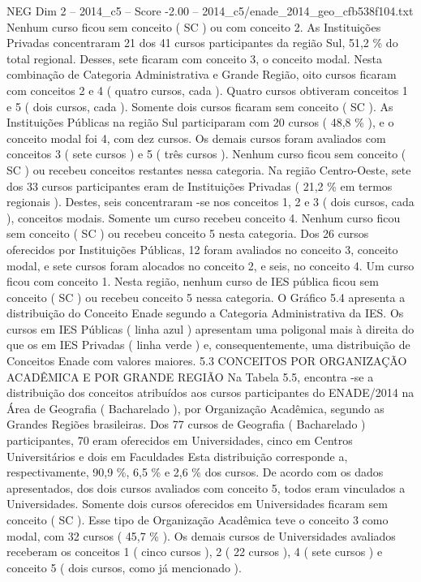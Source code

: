 \begin{textsample}{NEG Dim 2 – 2014\_c5 – Score -2.00 – 2014\_c5/enade\_2014\_geo\_cfb538f104.txt}
Nenhum curso ficou sem conceito ( SC ) ou com conceito 2.
As Instituições Privadas concentraram 21 dos 41 cursos participantes da região Sul, 51,2 \% do total regional.
Desses, sete ficaram com conceito 3, o conceito modal.
Nesta combinação de Categoria Administrativa e Grande Região, oito cursos ficaram com conceitos 2 e 4 ( quatro cursos, cada ).
Quatro cursos obtiveram conceitos 1 e 5 ( dois cursos, cada ).
Somente dois cursos ficaram sem conceito ( SC ).
As Instituições Públicas na região Sul participaram com 20 cursos ( 48,8 \% ), e o conceito modal foi 4, com dez cursos.
Os demais cursos foram avaliados com conceitos 3 ( sete cursos ) e 5 ( três cursos ).
Nenhum curso ficou sem conceito ( SC ) ou recebeu conceitos restantes nessa categoria.
Na região Centro-Oeste, sete dos 33 cursos participantes eram de Instituições Privadas ( 21,2 \% em termos regionais ).
Destes, seis concentraram -se nos conceitos 1, 2 e 3 ( dois cursos, cada ), conceitos modais.
Somente um curso recebeu conceito 4.
Nenhum curso ficou sem conceito ( SC ) ou recebeu conceito 5 nesta categoria.
Dos 26 cursos oferecidos por Instituições Públicas, 12 foram avaliados no conceito 3, conceito modal, e sete cursos foram alocados no conceito 2, e seis, no conceito 4.
Um curso ficou com conceito 1.
Nesta região, nenhum curso de IES pública ficou sem conceito ( SC ) ou recebeu conceito 5 nessa categoria.
O Gráfico 5.4 apresenta a distribuição do Conceito Enade segundo a Categoria Administrativa da IES.
Os cursos em IES Públicas ( linha azul ) apresentam uma poligonal mais à direita do que os em IES Privadas ( linha verde ) e, consequentemente, uma distribuição de Conceitos Enade com valores maiores. 5.3 CONCEITOS POR ORGANIZAÇÃO ACADÊMICA E POR GRANDE REGIÃO Na Tabela 5.5, encontra -se a distribuição dos conceitos atribuídos aos cursos participantes do ENADE/2014 na Área de Geografia ( Bacharelado ), por Organização Acadêmica, segundo as Grandes Regiões brasileiras.
Dos 77 cursos de Geografia ( Bacharelado ) participantes, 70 eram oferecidos em Universidades, cinco em Centros Universitários e dois em Faculdades Esta distribuição corresponde a, respectivamente, 90,9 \%, 6,5 \% e 2,6 \% dos cursos.
De acordo com os dados apresentados, dos dois cursos avaliados com conceito 5, todos eram vinculados a Universidades.
Somente dois cursos oferecidos em Universidades ficaram sem conceito ( SC ).
Esse tipo de Organização Acadêmica teve o conceito 3 como modal, com 32 cursos ( 45,7 \% ).
Os demais cursos de Universidades avaliados receberam os conceitos 1 ( cinco cursos ), 2 ( 22 cursos ), 4 ( sete cursos ) e conceito 5 ( dois cursos, como já mencionado ).

\end{textsample}
